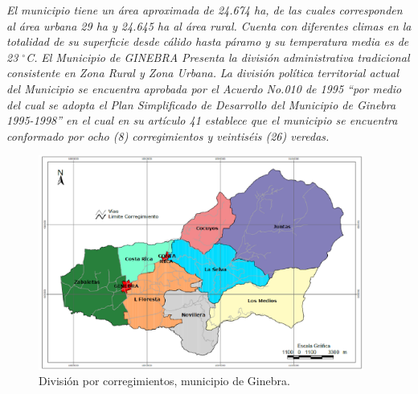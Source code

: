 \documentclass[12pt,letterpaper,openany]{book}
\newcommand{\grad}{$^{\circ}$}
\begin{document}
\textit{El municipio tiene un área aproximada de 24.674 ha, de las cuales corresponden al área urbana 29 ha y 24.645 ha al área rural. Cuenta con diferentes climas en la totalidad de su superficie desde cálido hasta páramo y su temperatura media es de 23 \grad C.}
\vspace{5mm}\newline
\textit{El Municipio de GINEBRA Presenta la división administrativa tradicional consistente en Zona Rural y Zona Urbana.}
\vspace{5mm}\newline	
\textit{La división política territorial actual del Municipio se encuentra aprobada por el Acuerdo No.010 de 1995 “por medio del cual se adopta el Plan Simplificado de Desarrollo del Municipio de Ginebra 1995-1998” en el cual en su artículo 41 establece que el municipio se encuentra conformado por ocho (8) corregimientos y veintiséis (26) veredas.}

\begin{figure}[H]
\begin{center}
\includegraphics[width=10.7cm]{./imagenes/division_corregimientos}
\caption{División por corregimientos, municipio de Ginebra.}
\end{center}
\end{figure}
\end{document}

